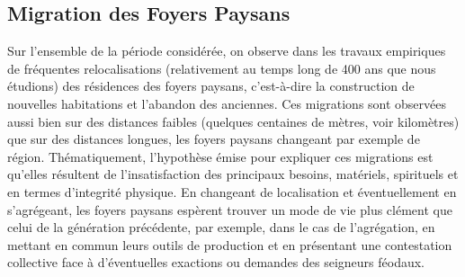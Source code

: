 %

\subsection{Migration des Foyers Paysans \label{meca-migration}}


Sur l'ensemble de la période considérée, on observe dans les travaux empiriques de \og fréquentes\fg{} relocalisations (relativement au temps long de 400 ans que nous étudions) des résidences des foyers paysans, c'est-à-dire la construction de nouvelles habitations et l'abandon des anciennes.
Ces \og migrations\fg{} sont observées aussi bien sur des distances faibles (quelques centaines de mètres, voir kilomètres) que sur des distances longues, les foyers paysans changeant par exemple de région.
Thématiquement, l'hypothèse émise pour expliquer ces migrations est qu'elles résultent de l'insatisfaction des principaux besoins, matériels, spirituels et en termes d'integrité physique.
En changeant de localisation et éventuellement en s'agrégeant, les foyers paysans espèrent trouver un mode de vie plus clément que celui de la génération précédente, par exemple, dans le cas de l'agrégation, en mettant en commun leurs outils de production et en présentant une contestation collective face à d'éventuelles exactions ou demandes des seigneurs féodaux.


